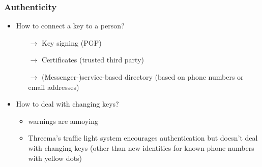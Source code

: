 \documentclass[
	aspectratio=169,
	xetex,
]{beamer}
\begin{document}
\begin{frame}
	\frametitle{Authenticity}
	\begin{itemize}
		\item How to connect a key to a person?
			\begin{itemize}
				\item[$\rightarrow$] Key signing (PGP)
				\item[$\rightarrow$] Certificates (trusted third party)
				\item[$\rightarrow$] (Messenger-)service-based directory (based on phone numbers or email addresses)
			\end{itemize}
		\item How to deal with changing keys?
			\begin{itemize}
				\item warnings are annoying
				\item Threema's traffic light system encourages authentication but doesn't deal with changing keys (other than new identities for known phone numbers with yellow dots)
			\end{itemize}

	\end{itemize}
\end{frame}
\end{document}
